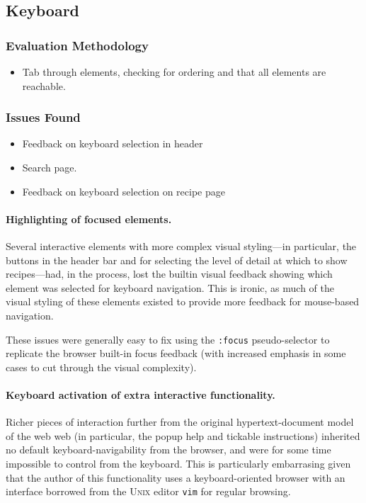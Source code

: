\subsection{Keyboard}

\subsubsection{Evaluation Methodology}

\begin{itemize}
\item Tab through elements, checking for ordering and that all
  elements are reachable.
\end{itemize}

\subsubsection{Issues Found}

\begin{itemize}
\item Feedback on keyboard selection in header
\item Search page.
\item Feedback on keyboard selection on recipe page
\end{itemize}

\paragraph{Highlighting of focused elements.}
Several interactive elements with more complex visual styling---in
particular, the buttons in the header bar and for selecting the level
of detail at which to show recipes---had, in the process, lost the
builtin visual feedback showing which element was selected for
keyboard navigation. This is ironic, as much of the visual styling of
these elements existed to provide more feedback for mouse-based
navigation.

These issues were generally easy to fix using the \verb!:focus!
  pseudo-selector to replicate the browser built-in focus feedback
  (with increased emphasis in some cases to cut through the visual
  complexity).

\paragraph{Keyboard activation of extra interactive functionality.}
Richer pieces of interaction further from the original
hypertext-document model of the web web (in particular, the popup help
and tickable instructions) inherited no default keyboard-navigability
from the browser, and were for some time impossible to control from
the keyboard. This is particularly embarrasing given that the author
of this functionality uses a keyboard-oriented browser with an
interface borrowed from the \textsc{Unix} editor \verb!vim! for
regular browsing.

